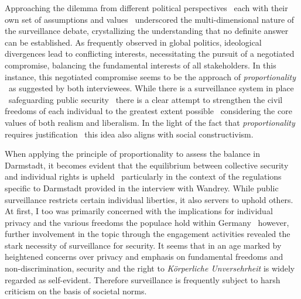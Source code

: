 \documentclass[12pt]{article}
\begin{document}
	Approaching the dilemma from different political perspectives \textemdash\ each with their own set of assumptions and values \textemdash\ underscored the multi-dimensional nature of the surveillance debate, crystallizing the understanding that no definite answer can be established. As frequently observed in global politics, ideological divergences lead to conflicting interests, necessitating the pursuit of a negotiated compromise, balancing the fundamental interests of all stakeholders. In this instance, this negotiated compromise seems to be the approach of \textit{proportionality} \textemdash\ as suggested by both interviewees. While there is a surveillance system in place \textemdash\ safeguarding public security \textemdash\ there is a clear attempt to strengthen the civil freedoms of each individual to the greatest extent possible \textemdash\ considering the core values of both realism and liberalism. In the light of the fact that \textit{proportionality} requires justification \textemdash\ this idea also aligns with social constructivism. 
	
	When applying the principle of proportionality to assess the balance in Darmstadt, it becomes evident that the equilibrium between collective security and individual rights is upheld \textemdash\ particularly in the context of the regulations specific to Darmstadt provided in the interview with Wandrey. While public surveillance restricts certain individual liberties, it also servers to uphold others. At first, I too was primarily concerned with the implications for individual privacy and the various freedoms the populace hold within Germany \textemdash\ however, further involvement in the topic through the engagement activities revealed the stark necessity of surveillance for security. It seems that in an age marked by heightened concerns over privacy and emphasis on fundamental freedoms and non-discrimination, security and the right to \textit{Körperliche Unversehrheit} is widely regarded as self-evident. Therefore surveillance is frequently subject to harsh criticism on the basis of societal norms. 
	
\end{document}
